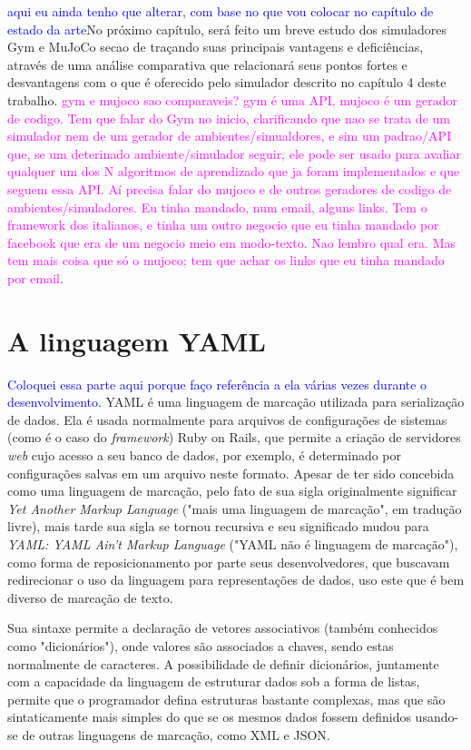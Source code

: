 \documentclass[cic,tc]{iiufrgs}
\newcommand\bruno[1]{\textcolor{magenta}{#1}}
\newcommand\henrique[1]{\textcolor{blue}{#1}}
\begin{document}
\henrique{aqui eu ainda tenho que alterar, com base no que vou colocar no capítulo de estado da arte}No próximo capítulo, será feito um breve estudo dos simuladores Gym e MuJoCo secao de traçando suas principais vantagens e deficiências, através de uma
análise comparativa que relacionará seus pontos fortes e desvantagens com o que é oferecido pelo simulador descrito no capítulo 4 deste trabalho. \bruno{gym e mujoco sao comparaveis? gym é uma API, mujoco é um gerador de codigo. Tem que falar do Gym no inicio, clarificando que nao se trata de um simulador nem de um gerador de ambientes/simualdores, e sim um padrao/API que, se um deterinado ambiente/simulador seguir, ele pode ser usado para avaliar qualquer um dos N algoritmos de aprendizado que ja foram implementados e que seguem essa API. Aí precisa falar do mujoco e de outros geradores de codigo de ambientes/simuladores. Eu tinha mandado, num email, alguns links. Tem o framework dos italianos, e tinha um outro negocio que eu tinha mandado por facebook que era de um negocio meio em modo-texto. Nao lembro qual era. Mas tem mais coisa que só o mujoco; tem que achar os links que eu tinha mandado por email}.

\section{A linguagem YAML}
\label{alinguagemyaml}
\henrique{Coloquei essa parte aqui porque faço referência a ela várias vezes durante o desenvolvimento.}
YAML é uma linguagem de marcação utilizada para serialização de dados. Ela é usada normalmente para arquivos de configurações de sistemas (como é o caso do \textit{framework})
Ruby on Rails, que permite a criação de servidores \textit{web} cujo acesso a seu banco de dados, por exemplo, é determinado por configurações salvas em um arquivo neste formato.
Apesar de ter sido concebida como uma linguagem de marcação, pelo fato de sua sigla originalmente significar \textit{Yet Another Markup Language} ("mais uma linguagem de marcação", em tradução livre),
mais tarde sua sigla se tornou recursiva e seu significado mudou para \textit{YAML: YAML Ain't Markup Language} ("YAML não é linguagem de marcação"),
como forma de reposicionamento por parte seus desenvolvedores, que buscavam redirecionar o uso da linguagem para representações de dados, uso este que é
bem diverso de marcação de texto. \par
Sua sintaxe permite a declaração de vetores associativos (também conhecidos como "dicionários"), onde valores são associados a chaves, sendo estas normalmente
 de caracteres.
A possibilidade de definir dicionários, juntamente com a capacidade da linguagem de estruturar dados sob a forma de listas, permite que o programador defina
estruturas bastante complexas, mas que são sintaticamente mais simples do que se os mesmos dados fossem definidos usando-se de outras linguagens de marcação, como XML e JSON.
\end{document}
